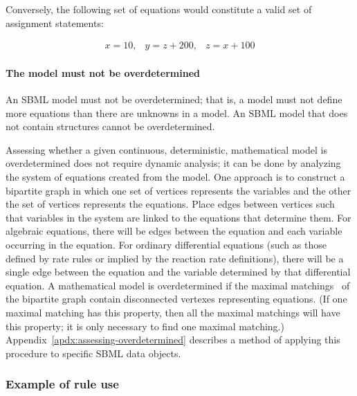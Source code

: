 Conversely, the following set of equations would constitute a
valid set of assignment statements:
\begin{linenomath}
\begin{equation*}
  \begin{array}{lll}
    x = 10, & y = z + 200, & z = x + 100
  \end{array}
\end{equation*}
\end{linenomath}


\paragraph{The model must not be overdetermined}

An SBML model must not be overdetermined; that is, a model must
not define more equations than there are unknowns in a model.  An
SBML model that does not contain \AlgebraicRule structures cannot
be overdetermined.

Assessing whether a given continuous, deterministic, mathematical
model is overdetermined does not require dynamic analysis; it can
be done by analyzing the system of equations created from the
model.  One approach is to construct a bipartite graph in which
one set of vertices represents the variables and the other the set
of vertices represents the equations.  Place edges between
vertices such that variables in the system are linked to the
equations that determine them.  For algebraic equations, there
will be edges between the equation and each variable occurring in
the equation.  For ordinary differential equations (such as those
defined by rate rules or implied by the reaction rate
definitions), there will be a single edge between the equation and
the variable determined by that differential equation.  A
mathematical model is overdetermined if the maximal
matchings~\citep{chartrand_1977} of the bipartite graph contain
disconnected vertexes representing equations.  (If one maximal
matching has this property, then all the maximal matchings will
have this property; \ie it is only necessary to find one maximal
matching.)  Appendix~\ref{apdx:assessing-overdetermined} describes
a method of applying this procedure to specific SBML data objects.


\subsubsection{Example of rule use}
\label{sec:eg-rule-use}

